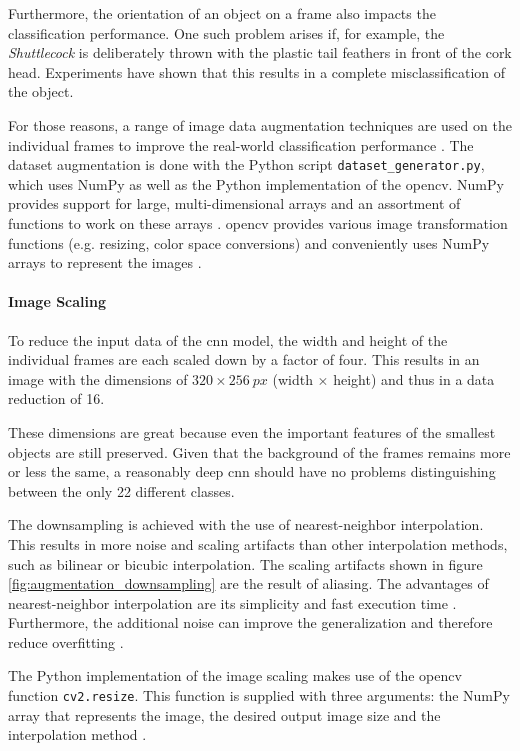 Furthermore, the orientation of an object on a frame also impacts the classification performance.
One such problem arises if, for example, the \textit{Shuttlecock} is deliberately thrown with the plastic tail feathers in front of the cork head.
Experiments have shown that this results in a complete misclassification of the object.

For those reasons, a range of image data augmentation techniques are used on the individual frames to improve the real-world classification performance \cite{training_data_augmentation}.
The dataset augmentation is done with the Python script \texttt{dataset\_generator.py}, which uses NumPy as well as the Python implementation of the \acrfull{opencv}.
NumPy provides support for large, multi-dimensional arrays and an assortment of functions to work on these arrays \cite{training_numpy}.
\acrshort{opencv} provides various image transformation functions (e.g. resizing, color space conversions) and conveniently uses NumPy arrays to represent the images \cite{training_opencv_intro}.

\paragraph{Image Scaling}
To reduce the input data of the \acrshort{cnn} model, the width and height of the individual frames are each scaled down by a factor of four.
This results in an image with the dimensions of $320\times\SI{256}{px}$ (width $\times$ height) and thus in a data reduction of \num{16}.

These dimensions are great because even the important features of the smallest objects are still preserved.
Given that the background of the frames remains more or less the same, a reasonably deep \acrshort{cnn} should have no problems distinguishing between the only \num{22} different classes.

The downsampling is achieved with the use of nearest-neighbor interpolation.
This results in more noise and scaling artifacts than other interpolation methods, such as bilinear or bicubic interpolation.
The scaling artifacts shown in figure \ref{fig:augmentation_downsampling} are the result of aliasing.
The advantages of nearest-neighbor interpolation are its simplicity and fast execution time \cite{training_interpolation}.
Furthermore, the additional noise can improve the generalization and therefore reduce overfitting \cite{training_noise}.

The Python implementation of the image scaling makes use of the \acrshort{opencv} function \texttt{cv2.resize}.
This function is supplied with three arguments: the NumPy array that represents the image, the desired output image size and the interpolation method \cite{training_opencv_resize}.

